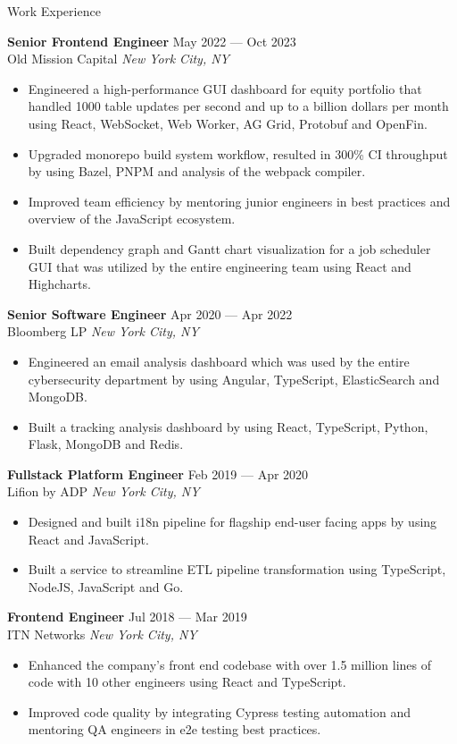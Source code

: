 \documentclass{resume} %
\begin{document}
\begin{rSection}{Work Experience}

\textbf{Senior Frontend Engineer} \hfill May 2022 --- Oct 2023 \\
Old Mission Capital \hfill \textit{New York City, NY}
\begin{itemize}
    \item {Engineered a high-performance GUI dashboard for equity portfolio that handled 1000 table updates per second and up to a billion dollars per month using React, WebSocket, Web Worker, AG Grid, Protobuf and OpenFin.}
    \item {Upgraded monorepo build system workflow, resulted in 300\% CI throughput by using Bazel, PNPM and analysis of the webpack compiler.}
    \item {Improved team efficiency by mentoring junior engineers in best practices and overview of the JavaScript ecosystem.}
    \item {Built dependency graph and Gantt chart visualization for a job scheduler GUI that was utilized by the entire engineering team using React and Highcharts.}
\end{itemize}
    
\textbf{Senior Software Engineer} \hfill Apr 2020 --- Apr 2022 \\
Bloomberg LP \hfill \textit{New York City, NY}
\begin{itemize}
    \item {Engineered an email analysis dashboard which was used by the entire cybersecurity department by using Angular, TypeScript, ElasticSearch and MongoDB.}
    \item {Built a tracking analysis dashboard by using React, TypeScript, Python, Flask, MongoDB and Redis.}
\end{itemize}

\textbf{Fullstack Platform Engineer} \hfill Feb 2019 --- Apr 2020 \\
Lifion by ADP \hfill \textit{New York City, NY}
\begin{itemize}
    \item {Designed and built i18n pipeline for flagship end-user facing apps by using React and JavaScript.}
    \item {Built a service to streamline ETL pipeline transformation using TypeScript, NodeJS, JavaScript and Go.}
\end{itemize}

\textbf{Frontend Engineer} \hfill Jul 2018 --- Mar 2019 \\
ITN Networks \hfill \textit{New York City, NY}
\begin{itemize}
    \item {Enhanced the company's front end codebase with over 1.5 million lines of code with 10 other engineers using React and TypeScript.}
    \item {Improved code quality by integrating Cypress testing automation and mentoring QA engineers in e2e testing best practices.} 
\end{itemize}


\end{rSection}
\end{document}
